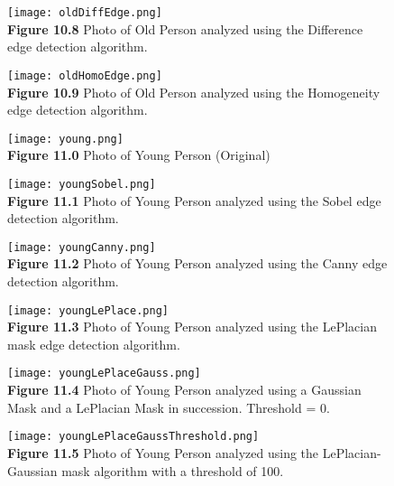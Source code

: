 \documentclass{article}%
\begin{document}
\newpage
\begin{figure}[h]
\centering
\texttt{[image: oldDiffEdge.png]}\\
{\bf Figure 10.8} Photo of Old Person analyzed using the Difference edge detection algorithm.  
\end{figure}

\newpage
\begin{figure}[h]
\centering
\texttt{[image: oldHomoEdge.png]}\\
{\bf Figure 10.9} Photo of Old Person analyzed using the Homogeneity edge detection algorithm.  
\end{figure}
\clearpage


\newpage
\begin{figure}[h]
\centering
\texttt{[image: young.png]}\\
{\bf Figure 11.0} Photo of Young Person (Original)
\end{figure}

\newpage
\begin{figure}[h]
\centering
\texttt{[image: youngSobel.png]}\\
{\bf Figure 11.1} Photo of Young Person analyzed using the Sobel edge detection algorithm.   
\end{figure}

\newpage
\begin{figure}[h]
\centering
\texttt{[image: youngCanny.png]}\\
{\bf Figure 11.2} Photo of Young Person analyzed using the Canny edge detection algorithm.   
\end{figure}

\newpage
\begin{figure}[h]
\centering
\texttt{[image: youngLePlace.png]}\\
{\bf Figure 11.3} Photo of Young Person analyzed using the LePlacian mask edge detection algorithm.  
\end{figure}

\newpage
\begin{figure}[h]
\centering
\texttt{[image: youngLePlaceGauss.png]}\\
{\bf Figure 11.4} Photo of Young Person analyzed using a Gaussian Mask and a LePlacian Mask in succession. Threshold = 0.   
\end{figure}

\newpage
\begin{figure}[h]
\centering
\texttt{[image: youngLePlaceGaussThreshold.png]}\\
{\bf Figure 11.5} Photo of Young Person analyzed using the LePlacian-Gaussian mask algorithm with a threshold of 100.  
\end{figure}
\end{document}
